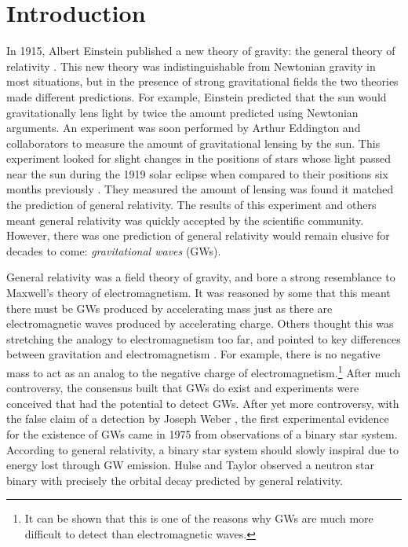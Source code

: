 \documentclass[11pt]{cuthesis}
\begin{document}
\mainmatter

\chapter{Introduction}
In 1915, Albert Einstein published a new theory of gravity: the general theory of relativity \cite{einstein_gr}. This new theory was indistinguishable from Newtonian gravity in most situations, but in the presence of strong gravitational fields the two theories made different predictions. For example, Einstein predicted that the sun would gravitationally lens light by twice the amount predicted using Newtonian arguments. An experiment was soon performed by Arthur Eddington and collaborators to measure the amount of gravitational lensing by the sun. This experiment looked for slight changes in the positions of stars whose light passed near the sun during the 1919 solar eclipse when compared to their positions six months previously \cite{eclipse1919}. They measured the amount of lensing was found it matched the prediction of general relativity. The results of this experiment and others meant general relativity was quickly accepted by the scientific community. However, there was one prediction of general relativity would remain elusive for decades to come: \textit{gravitational waves} (GWs). 

General relativity was a field theory of gravity, and bore a strong resemblance to Maxwell's theory of electromagnetism. \cite{maxwell} It was reasoned by some that this meant there must be GWs produced by accelerating mass just as there are electromagnetic waves produced by accelerating charge. Others thought this was stretching the analogy to electromagnetism too far, and pointed to key differences between gravitation and electromagnetism \cite{thoughtspeed}. For example, there is no negative mass to act as an analog to the negative charge of electromagnetism.\footnote{It can be shown that this is one of the reasons why GWs are much more difficult to detect than electromagnetic waves.} After much controversy, the consensus built that GWs do exist and experiments were conceived that had the potential to detect GWs. After yet more controversy, with the false claim of a detection by Joseph Weber \cite{weber}, the first experimental evidence for the existence of GWs came in 1975 from observations of a binary star system. According to general relativity, a binary star system should slowly inspiral due to energy lost through GW emission. Hulse and Taylor observed a neutron star binary with precisely the orbital decay predicted by general relativity. \cite{Hulse} 
\end{document}
